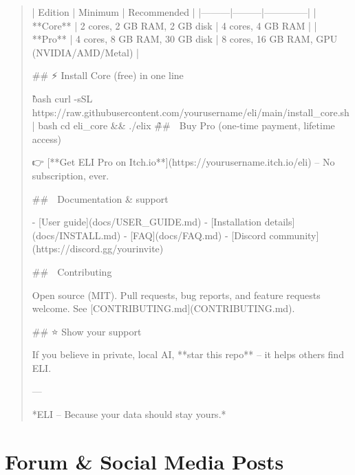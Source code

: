 \documentclass[11pt,a4paper]{article}
\begin{document}
\begin{quote}
| Edition | Minimum | Recommended |
|---------|---------|--------------|
| **Core** | 2 cores, 2 GB RAM, 2 GB disk | 4 cores, 4 GB RAM |
| **Pro** | 4 cores, 8 GB RAM, 30 GB disk | 8 cores, 16 GB RAM, GPU (NVIDIA/AMD/Metal) |

\#\# ⚡ Install Core (free) in one line

\`\`\`bash
curl -sSL https://raw.githubusercontent.com/yourusername/eli/main/install_core.sh | bash
cd eli_core \&\& ./elix
\`\`\`

\#\# 💎 Buy Pro (one‑time payment, lifetime access)

👉 [**Get ELI Pro on Itch.io**](https://yourusername.itch.io/eli) – No subscription, ever.

\#\# 📖 Documentation \& support

- [User guide](docs/USER_GUIDE.md)
- [Installation details](docs/INSTALL.md)
- [FAQ](docs/FAQ.md)
- [Discord community](https://discord.gg/yourinvite)

\#\# 🤝 Contributing

Open source (MIT). Pull requests, bug reports, and feature requests welcome.  
See [CONTRIBUTING.md](CONTRIBUTING.md).

\#\# ⭐ Show your support

If you believe in private, local AI, **star this repo** – it helps others find ELI.

---

*ELI – Because your data should stay yours.*
\end{quote}

\newpage

\section{Forum \& Social Media Posts}
\label{sec:posts}
\end{document}
